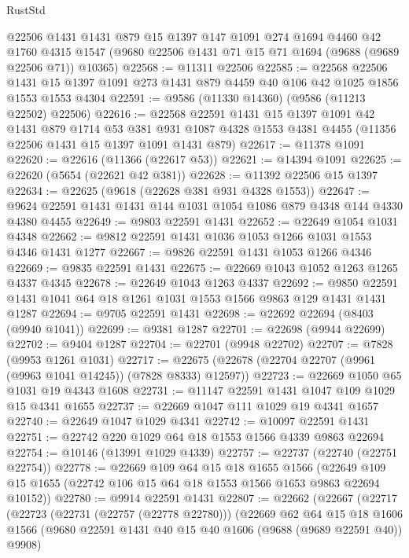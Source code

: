 \begin{lexlean}{RustStd}
\begin{coremodule}
    @22506
    @1431
    @1431
    @879
    @15
    @1397
    @147
    @1091
    @274
    @1694
    @4460
    @42
    @1760
    @4315
    @1547
    (@9680 @22506 @1431 @71 @15 @71 @1694 (@9688 (@9689 @22506 @71)) @10365)
@22568 := @11311 @22506
@22585 := @22568
    @22506
    @1431
    @15
    @1397
    @1091
    @273
    @1431
    @879
    @4459
    @40
    @106
    @42
    @1025
    @1856
    @1553
    @1553
    @4304
@22591 := @9586 (@11330 @14360) (@9586 (@11213 @22502) @22506)
@22616 := @22568
    @22591
    @1431
    @15
    @1397
    @1091
    @42
    @1431
    @879
    @1714
    @53
    @381
    @931
    @1087
    @4328
    @1553
    @4381
    @4455
    (@11356 @22506 @1431 @15 @1397 @1091 @1431 @879)
@22617 := @11378 @1091
@22620 := @22616 (@11366 (@22617 @53))
@22621 := @14394 @1091
@22625 := @22620 (@5654 (@22621 @42 @381))
@22628 := @11392 @22506 @15 @1397
@22634 := @22625 (@9618 (@22628 @381 @931 @4328 @1553))
@22647 := @9624 @22591 @1431 @1431 @144 @1031 @1054 @1086 @879 @4348 @144 @4330 @4380 @4455
@22649 := @9803 @22591 @1431
@22652 := @22649 @1054 @1031 @4348
@22662 := @9812 @22591 @1431 @1036 @1053 @1266 @1031 @1553 @4346 @1431 @1277
@22667 := @9826 @22591 @1431 @1053 @1266 @4346
@22669 := @9835 @22591 @1431
@22675 := @22669 @1043 @1052 @1263 @1265 @4337 @4345
@22678 := @22649 @1043 @1263 @4337
@22692 := @9850 @22591 @1431 @1041 @64 @18 @1261 @1031 @1553 @1566 @9863 @129 @1431 @1431 @1287
@22694 := @9705 @22591 @1431
@22698 := @22692 @22694 (@8403 (@9940 @1041))
@22699 := @9381 @1287
@22701 := @22698 (@9944 @22699)
@22702 := @9404 @1287
@22704 := @22701 (@9948 @22702)
@22707 := @7828 (@9953 @1261 @1031)
@22717 := @22675 (@22678 (@22704 @22707 (@9961 (@9963 @1041 @14245)) (@7828 @8333) @12597))
@22723 := @22669 @1050 @65 @1031 @19 @4343 @1608
@22731 := @11147 @22591 @1431 @1047 @109 @1029 @15 @4341 @1655
@22737 := @22669 @1047 @111 @1029 @19 @4341 @1657
@22740 := @22649 @1047 @1029 @4341
@22742 := @10097 @22591 @1431
@22751 := @22742 @220 @1029 @64 @18 @1553 @1566 @4339 @9863 @22694
@22754 := @10146 (@13991 @1029 @4339)
@22757 := @22737 (@22740 (@22751 @22754))
@22778 := @22669
    @109
    @64
    @15
    @18
    @1655
    @1566
    (@22649 @109 @15 @1655 (@22742 @106 @15 @64 @18 @1553 @1566 @1653 @9863 @22694 @10152))
@22780 := @9914 @22591 @1431
@22807 := @22662
    (@22667
      (@22717
        (@22723
          (@22731 (@22757 (@22778 @22780)))
          (@22669
            @62
            @64
            @15
            @18
            @1606
            @1566
            (@9680 @22591 @1431 @40 @15 @40 @1606 (@9688 (@9689 @22591 @40)) @9908)

\end{coremodule}
\end{lexlean}
